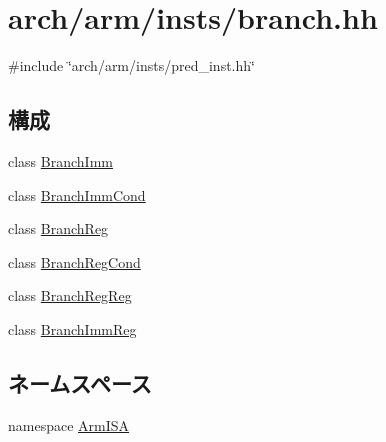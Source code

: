 \hypertarget{arm_2insts_2branch_8hh}{
\section{arch/arm/insts/branch.hh}
\label{arm_2insts_2branch_8hh}
}
{\ttfamily \#include \char`\"{}arch/arm/insts/pred\_\-inst.hh\char`\"{}}\par
\subsection*{構成}
\begin{DoxyCompactItemize}
\item 
class \hyperlink{classArmISA_1_1BranchImm}{BranchImm}
\item 
class \hyperlink{classArmISA_1_1BranchImmCond}{BranchImmCond}
\item 
class \hyperlink{classArmISA_1_1BranchReg}{BranchReg}
\item 
class \hyperlink{classArmISA_1_1BranchRegCond}{BranchRegCond}
\item 
class \hyperlink{classArmISA_1_1BranchRegReg}{BranchRegReg}
\item 
class \hyperlink{classArmISA_1_1BranchImmReg}{BranchImmReg}
\end{DoxyCompactItemize}
\subsection*{ネームスペース}
\begin{DoxyCompactItemize}
\item 
namespace \hyperlink{namespaceArmISA}{ArmISA}
\end{DoxyCompactItemize}
